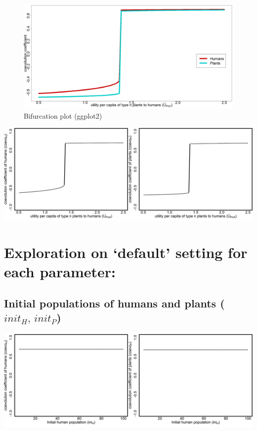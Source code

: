 \documentclass[
]{book}
\begin{document}
\begin{figure}
\includegraphics[width=1\linewidth]{plots/2_exp_utility_per_capita_type_n_plants_to_humans_bifurcationPlotSimple} \caption{Bifurcation plot (ggplot2)}\label{fig:2mUPnHbifplot1print}
\end{figure}

\includegraphics[width=1\linewidth]{plots/2_exp_utility_per_capita_type_n_plants_to_humans_bifurcationPlotPair}

\newpage

\hypertarget{exploration-on-default-setting-for-each-parameter}{%
\section{Exploration on `default' setting for each parameter:}\label{exploration-on-default-setting-for-each-parameter}}

\hypertarget{initial-populations-of-humans-and-plants-init_hinit_p}{%
\subsection{\texorpdfstring{Initial populations of humans and plants (\(init_{H},\,init_{P}\))}{Initial populations of humans and plants (init\_\{H\},\textbackslash,init\_\{P\})}}\label{initial-populations-of-humans-and-plants-init_hinit_p}}

\includegraphics[width=1\linewidth]{plots/2_exp_initial_population_humans_bifurcationPlotPair}
\end{document}
